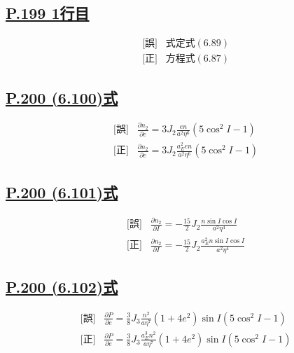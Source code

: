 \documentclass[9pt,fleqn]{bxjsarticle}
\begin{document}
\subsection*{\underline{P.199 1行目}}
\begin{align*}
    &\text{[誤]} \hspace{10pt} 式定式(6.89)\\
    &\text{[正]} \hspace{10pt} 方程式(6.87) 
\end{align*}

\subsection*{\underline{P.200 (6.100)式}}
\begin{align*}
    &\text{[誤]} \hspace{10pt} \frac{\partial{n}_2}{\partial{e}} = 3J_2\frac{en}{a^2\eta^6}\left(5\cos^2{I}-1\right) \\
    &\text{[正]} \hspace{10pt} \frac{\partial{n}_2}{\partial{e}} = 3J_2\frac{a_E^2en}{a^2\eta^6}\left(5\cos^2{I}-1\right) 
\end{align*}

\subsection*{\underline{P.200 (6.101)式}}
\begin{align*}
    &\text{[誤]} \hspace{10pt} \frac{\partial{n}_2}{\partial{I}} = -\frac{15}{2}J_2\frac{n\sin{I}\cos{I}}{a^2\eta^4} \\
    &\text{[正]} \hspace{10pt} \frac{\partial{n}_2}{\partial{I}} = -\frac{15}{2}J_2\frac{a_E^2n\sin{I}\cos{I}}{a^2\eta^4}
\end{align*}

\subsection*{\underline{P.200 (6.102)式}}
\begin{align*}
    &\text{[誤]} \hspace{10pt} \frac{\partial{P}}{\partial{e}} = \frac{3}{8}J_3\frac{n^2}{a\eta^7}\left(1+4e^2\right)\sin{I}\left(5\cos^2{I}-1\right) \\
    &\text{[正]} \hspace{10pt} \frac{\partial{P}}{\partial{e}} = \frac{3}{8}J_3\frac{a_E^3n^2}{a\eta^7}\left(1+4e^2\right)\sin{I}\left(5\cos^2{I}-1\right)
\end{align*}
\end{document}
